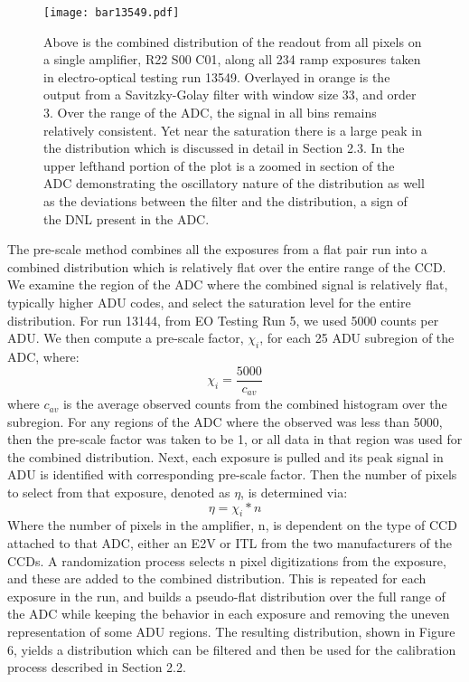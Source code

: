 \documentclass[11pt, letterpaper]{article}
\begin{document}
\begin{figure}
	\texttt{[image: bar13549.pdf]}
	\caption{Above is the combined distribution of the readout from all pixels on a single amplifier, R22 S00 C01, along all 234 ramp exposures taken in electro-optical testing run 13549. Overlayed in orange is the output from a Savitzky-Golay filter with window size 33, and order 3. Over the range of the ADC, the signal in all bins remains relatively consistent. Yet near the saturation there is a large peak in the distribution which is discussed in detail in Section 2.3. In the upper lefthand portion of the plot is a zoomed in section of the ADC demonstrating the oscillatory nature of the distribution as well as the deviations between the filter and the distribution, a sign of the DNL present in the ADC.}
\end{figure}
\indent


The pre-scale method combines all the exposures from a flat pair run into a combined distribution which is relatively flat over the entire range of the CCD. 
We examine the region of the ADC where the combined signal is relatively flat, typically higher ADU codes, and select the saturation level for the entire distribution. 
For run 13144, from EO Testing Run 5, we used 5000 counts per ADU. 
 We then compute a pre-scale factor, $\chi _i$, for each 25 ADU subregion of the ADC, where:
\begin{equation}\label{}
\chi_i = \frac{5000}{c_{av}}
\end{equation}
where $c_{av}$ is the average observed counts from the combined histogram over the subregion. 
For any regions of the ADC where the observed was less than 5000, then the pre-scale factor was taken to be 1, or all data in that region was used for the combined distribution. 
Next, each exposure is pulled and its peak signal in ADU is identified with corresponding pre-scale factor. 
Then the number of pixels to select from that exposure, denoted as $\eta $, is determined via: 
 \begin{equation}\label{}
 \eta = \chi_i *n 
\end{equation}
Where the number of pixels in the amplifier, n, is dependent on the type of CCD attached to that ADC, either an E2V or ITL from the two manufacturers of the CCDs. 
A randomization process selects n pixel digitizations from the exposure, and these are added to the combined distribution. 
This is repeated for each exposure in the run, and builds a pseudo-flat distribution over the full range of the ADC while keeping the behavior in each exposure and removing the uneven representation of some ADU regions. 
The resulting distribution, shown in Figure 6, yields a distribution which can be filtered and then be used for the calibration process described in Section 2.2. 
\end{document}
